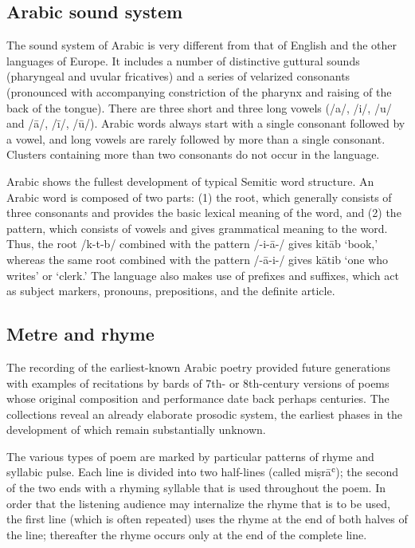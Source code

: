 \documentclass[12pt]{report}
\begin{document}
\subsection*{Arabic sound system}
The sound system of Arabic is very different from that of English and the other
languages of Europe. It includes a number of distinctive guttural sounds
(pharyngeal and uvular fricatives) and a series of velarized consonants
(pronounced with accompanying constriction of the pharynx and raising of the back
of the tongue). There are three short and three long vowels (/a/, /i/, /u/ and
/ā/, /ī/, /ū/). Arabic words always start with a single consonant followed by a
vowel, and long vowels are rarely followed by more than a single consonant.
Clusters containing more than two consonants do not occur in the language.

Arabic shows the fullest development of typical Semitic word structure. An Arabic
word is composed of two parts: (1) the root, which generally consists of three
consonants and provides the basic lexical meaning of the word, and (2) the
pattern, which consists of vowels and gives grammatical meaning to the word.
Thus, the root /k-t-b/ combined with the pattern /-i-ā-/ gives kitāb ‘book,’
whereas the same root combined with the pattern /-ā-i-/ gives kātib ‘one who
writes’ or ‘clerk.’ The language also makes use of prefixes and suffixes, which
act as subject markers, pronouns, prepositions, and the definite article.

\subsection*{Metre and rhyme}
The recording of the earliest-known Arabic poetry provided future generations
with examples of recitations by bards of 7th- or 8th-century versions of poems
whose original composition and performance date back perhaps centuries. The
collections reveal an already elaborate prosodic system, the earliest phases in
the development of which remain substantially unknown.

The various types of poem are marked by particular patterns of rhyme and syllabic
pulse. Each line is divided into two half-lines (called miṣrāʿ); the second of
the two ends with a rhyming syllable that is used throughout the poem. In order
that the listening audience may internalize the rhyme that is to be used, the
first line (which is often repeated) uses the rhyme at the end of both halves of
the line; thereafter the rhyme occurs only at the end of the complete line.
\end{document}
